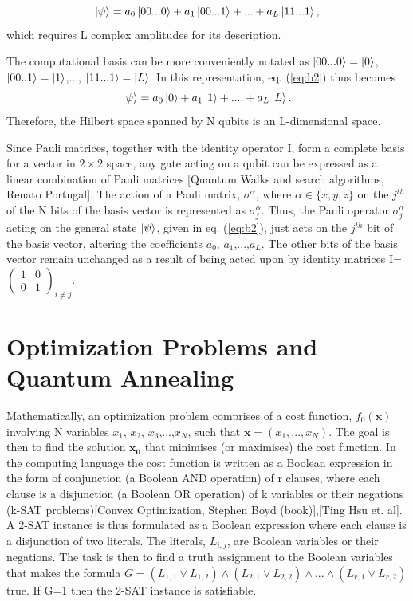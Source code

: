 \documentclass[../main.tex]{subfiles}
\begin{document}
\begin{equation}
\ket{\psi} =a_0 \ket{00...0}+a_1 \ket{00...1}+...+a_L \ket{11...1},
\label{eq:b2}
\end{equation}
which requires L complex amplitudes for its description.

The computational basis can be more conveniently notated as $\ket{00...0}=\ket{0}$, $\ket{00..1}=\ket{1}$,..., $\ket{11...1}=\ket{L}$. In this representation, eq. (\ref{eq:b2}) thus becomes
\begin{equation}
\ket{\psi}= a_0\ket{0}+a_1\ket{1}+....+a_L\ket{L}.  \label{eq:b3}
\end{equation}
Therefore, the Hilbert space spanned by N qubits is an L-dimensional space.

Since Pauli matrices, together with the identity operator I, form a complete basis for a vector in $2 \times 2$ space, any gate acting on a qubit can be expressed as a linear combination of Pauli matrices [Quantum Walks and search algorithms, Renato Portugal]. The action of a Pauli matrix, $\sigma^\alpha$, where $\alpha \in \{x,y,z\}$ on the $j^{th}$ of the N bits of the basis vector is represented as $\sigma_j^\alpha$. Thus, the Pauli operator $\sigma_j^\alpha$ acting on the general state $\ket{\psi}$, given in eq. (\ref{eq:b2}), just acts on the $j^{th}$ bit of the basis vector, altering the coefficients $a_0$, $a_1$,...,$a_L$. The other bits of the basis vector remain unchanged as a result of being acted upon by identity matrices I=$\begin{pmatrix}
1&0\\
0&1
\end{pmatrix}_{i \neq j}
$.\\
\section{Optimization Problems and Quantum Annealing} 
Mathematically, an optimization problem comprises of a cost function, $f_0(\textbf{x})$ involving N variables $x_1$, $x_2$, $x_3$,...,$x_N$, such that $\textbf{x}=(x_1,...,x_N)$. The goal is then to find the solution $\mathbf{x_0}$ that minimises (or maximises) the cost function. In the computing language the cost function is written as a Boolean expression in the form of conjunction (a Boolean AND operation) of r clauses, where each clause is a disjunction (a Boolean OR operation) of k variables or their negations (k-SAT problems)[Convex Optimization, Stephen Boyd (book)],[Ting Hsu et. al]. A 2-SAT instance is thus formulated as a Boolean expression where each clause is a disjunction of two literals. The literals, $L_{i,j}$, are Boolean variables or their negations. The task is then to find a truth assignment to the Boolean variables that makes the formula $G=(L_{1,1} \lor L_{1,2}) \land (L_{2,1} \lor L_{2,2}) \land ... \land (L_{r,1} \lor L_{r,2})$ true. If G=1 then the 2-SAT instance is satisfiable.
\end{document}
